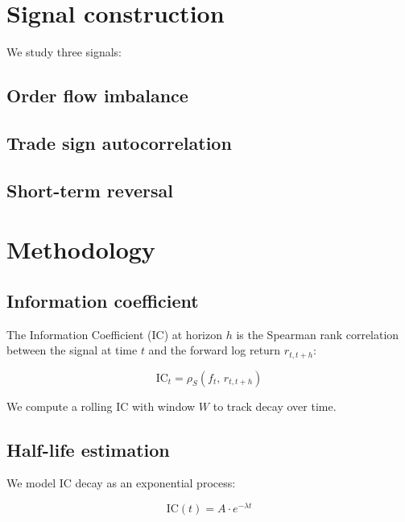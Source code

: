 \documentclass[12pt]{article}
\begin{document}
\section{Signal construction}
\label{sec:signals}


We study three signals:

\subsection{Order flow imbalance}

\subsection{Trade sign autocorrelation}

\subsection{Short-term reversal}

\section{Methodology}
\label{sec:method}

\subsection{Information coefficient}

The Information Coefficient (IC) at horizon $h$ is the Spearman rank
correlation between the signal at time $t$ and the forward log return
$r_{t,t+h}$:

\begin{equation}
    \text{IC}_t = \rho_S\!\left(f_t,\, r_{t,t+h}\right)
\end{equation}

We compute a rolling IC with window $W$ to track decay over time.

\subsection{Half-life estimation}

We model IC decay as an exponential process:

\begin{equation}
    \text{IC}(t) = A \cdot e^{-\lambda t}
\end{equation}
\end{document}
